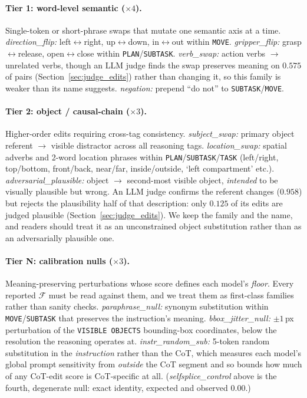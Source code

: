 \paragraph{Tier 1: word-level semantic ($\times 4$).} Single-token or short-phrase swaps that mutate one semantic axis at a time. \emph{direction\_flip:} left$\leftrightarrow$right, up$\leftrightarrow$down, in$\leftrightarrow$out within \texttt{MOVE}. \emph{gripper\_flip:} grasp$\leftrightarrow$release, open$\leftrightarrow$close within \texttt{PLAN}/\texttt{SUBTASK}. \emph{verb\_swap:} action verbs $\to$ unrelated verbs, though an LLM judge finds the swap preserves meaning on $0.575$ of pairs (Section~\ref{sec:judge_edits}) rather than changing it, so this family is weaker than its name suggests. \emph{negation:} prepend ``do not'' to \texttt{SUBTASK}/\texttt{MOVE}.

\paragraph{Tier 2: object / causal-chain ($\times 3$).} Higher-order edits requiring cross-tag consistency. \emph{subject\_swap:} primary object referent $\to$ visible distractor across all reasoning tags. \emph{location\_swap:} spatial adverbs and 2-word location phrases within \texttt{PLAN}/\texttt{SUBTASK}/\texttt{TASK} (left/right, top/bottom, front/back, near/far, inside/outside, `left compartment' etc.). \emph{adversarial\_plausible:} object $\to$ second-most visible object, \emph{intended} to be visually plausible but wrong. An LLM judge confirms the referent changes ($0.958$) but rejects the plausibility half of that description: only $0.125$ of its edits are judged plausible (Section~\ref{sec:judge_edits}). We keep the family and the name, and readers should treat it as an unconstrained object substitution rather than as an adversarially plausible one.

\paragraph{Tier N: calibration nulls ($\times 3$).} Meaning-preserving perturbations whose score defines each model's \emph{floor}. Every reported $\mathcal{F}$ must be read against them, and we treat them as first-class families rather than sanity checks. \emph{paraphrase\_null:} synonym substitution within \texttt{MOVE}/\texttt{SUBTASK} that preserves the instruction's meaning. \emph{bbox\_jitter\_null:} $\pm 1$\,px perturbation of the \texttt{VISIBLE OBJECTS} bounding-box coordinates, below the resolution the reasoning operates at. \emph{instr\_random\_sub:} 5-token random substitution in the \emph{instruction} rather than the CoT, which measures each model's global prompt sensitivity from \emph{outside} the CoT segment and so bounds how much of any CoT-edit score is CoT-specific at all. (\emph{selfsplice\_control} above is the fourth, degenerate null: exact identity, expected and observed $0.00$.)

